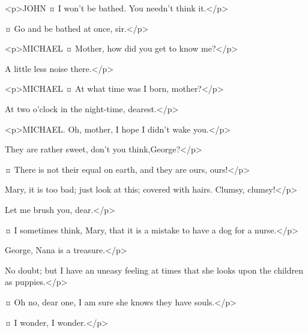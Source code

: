 <p>JOHN ¤
I won't be bathed. You needn't think it.</p>

\mrdarlingspeaks {}¤
Go and be bathed at once, sir.</p>


<p>MICHAEL ¤
Mother, how did you get to know me?</p>

\mrdarlingspeaks
A little less noise there.</p>

<p>MICHAEL ¤
At what time was I born, mother?</p>

\mrsdarlingspeaks
At two o'clock in the night-time, dearest.</p>

<p>MICHAEL. Oh, mother, I hope I didn't wake you.</p>

\mrsdarlingspeaks
They are rather sweet, don't you think,George?</p>

\mrdarlingspeaks {}¤
There is not their equal on earth, and they are ours, ours!</p>


\mrdarlingspeaks
Mary, it is too bad; just look at this; covered with hairs. Clumsy, clumsy!</p>


\mrsdarlingspeaks
Let me brush you, dear.</p>


\mrdarlingspeaks {}¤
I sometimes think, Mary, that it is a mistake to have a dog for a nurse.</p>

\mrsdarlingspeaks
George, Nana is a treasure.</p>

\mrdarlingspeaks
No doubt; but I have an uneasy feeling at times that she looks upon the children as puppies.</p>

\mrsdarlingspeaks {}¤
Oh no, dear one, I am sure she knows they have souls.</p>

\mrdarlingspeaks {}¤
I wonder, I wonder.</p>


